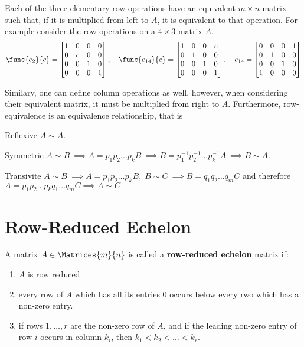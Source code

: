Each of the three elementary row operations have an equivalent \(m \times n\) matrix such that, if it is multiplied from left to \(A\), it is equivalent to that operation. For example consider the row operations on a \(4 \times 3\) matrix \(A\).
\begin{equation*}
    \func{e_2}{c} = \begin{bmatrix}
        1 & 0 & 0 & 0 \\
        0 & c & 0 & 0 \\
        0 & 0 & 1 & 0 \\
        0 & 0 & 0 & 1 \\
    \end{bmatrix}, \quad
    \func{e_{14}}{c} = \begin{bmatrix}
        1 & 0 & 0 & c \\
        0 & 1 & 0 & 0 \\
        0 & 0 & 1 & 0 \\
        0 & 0 & 0 & 1
    \end{bmatrix}, \quad
    e_{14} = \begin{bmatrix}
        0 & 0 & 0 & 1 \\
        0 & 1 & 0 & 0 \\
        0 & 0 & 1 & 0 \\
        1 & 0 & 0 & 0
    \end{bmatrix}
\end{equation*}

Similary, one can define column operations as well, however, when considering their equivalent matrix, it must be multiplied from right to \(A\).
Furthermore, row-equivalence is an equivalence relationship, that is
\begin{definition}
    \item [Reflexive] \(A \sim A\).
    \item [Symmetric] \(A \sim B \ \implies A = p_1p_2 \dots p_k B \ \implies B = p_1^{-1}p_2^{-1} \dots p_k^{-1} A \ \implies B \sim A\).
    \item [Transivite] \(A \sim B \ \implies A = p_1p_2 \dots p_k B, \; B \sim C \ \implies B = q_1q_2 \dots q_m C\) and therefore \(A =  p_1p_2 \dots p_k  q_1 \dots q_m C \implies A \sim C\)
\end{definition}

\section{Row-Reduced Echelon}
A matrix \(A \in \Matrices{m}{n}\) is called a \textbf{row-reduced echelon} matrix if:
\begin{enumerate}
    \item \(A\) is row reduced.
    \item every row of \(A\) which has all its entries \(0\) occurs below every rwo which has a non-zero entry.
    \item if rows \(1, \dots , r\) are the non-zero row of \(A\), and if the leading non-zero entry of row \(i\) occurs in column \(k_i\), then \(k_1 < k_2 < \dots < k_r\).
\end{enumerate}

